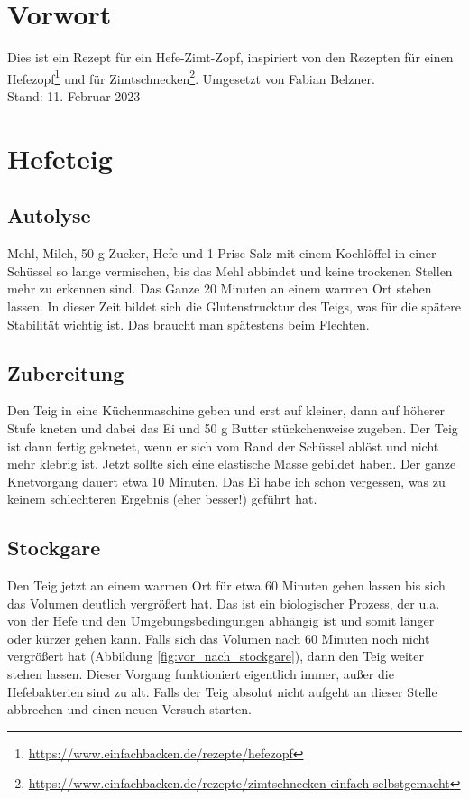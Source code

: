 \documentclass[a4paper, oneside]{recipe}
\begin{document}

\section*{Vorwort}
Dies ist ein Rezept für ein Hefe-Zimt-Zopf, inspiriert von den Rezepten für einen Hefezopf\footnote{\url{https://www.einfachbacken.de/rezepte/hefezopf}} und für Zimtschnecken\footnote{\url{https://www.einfachbacken.de/rezepte/zimtschnecken-einfach-selbstgemacht}}. Umgesetzt von Fabian Belzner.\\

Stand: 11. Februar 2023

\section*{Hefeteig}
\subsection*{Autolyse}
Mehl, Milch, 50 g Zucker, Hefe und 1 Prise Salz mit einem Kochlöffel in einer Schüssel so lange vermischen, bis das Mehl abbindet und keine trockenen Stellen mehr zu erkennen sind. Das Ganze 20 Minuten an einem warmen Ort stehen lassen. In dieser Zeit bildet sich die Glutenstrucktur des Teigs, was für die spätere Stabilität wichtig ist. Das braucht man spätestens beim Flechten.

\subsection*{Zubereitung}
Den Teig in eine Küchenmaschine geben und erst auf kleiner, dann auf höherer Stufe kneten und dabei das Ei und 50 g Butter stückchenweise zugeben. Der Teig ist dann fertig geknetet, wenn er sich vom Rand der Schüssel ablöst und nicht mehr klebrig ist. Jetzt sollte sich eine elastische Masse gebildet haben. Der ganze Knetvorgang dauert etwa 10 Minuten. Das Ei habe ich schon vergessen, was zu keinem schlechteren Ergebnis (eher besser!) geführt hat.

\subsection*{Stockgare}
Den Teig jetzt an einem warmen Ort für etwa 60 Minuten gehen lassen bis sich das Volumen deutlich vergrößert hat. Das ist ein biologischer Prozess, der u.a. von der Hefe und den Umgebungsbedingungen abhängig ist und somit länger oder kürzer gehen kann. Falls sich das Volumen nach 60 Minuten noch nicht vergrößert hat (Abbildung \ref{fig:vor_nach_stockgare}), dann den Teig weiter stehen lassen. Dieser Vorgang funktioniert eigentlich immer, außer die Hefebakterien sind zu alt. Falls der Teig absolut nicht aufgeht an dieser Stelle abbrechen und einen neuen Versuch starten. 
\end{document}
